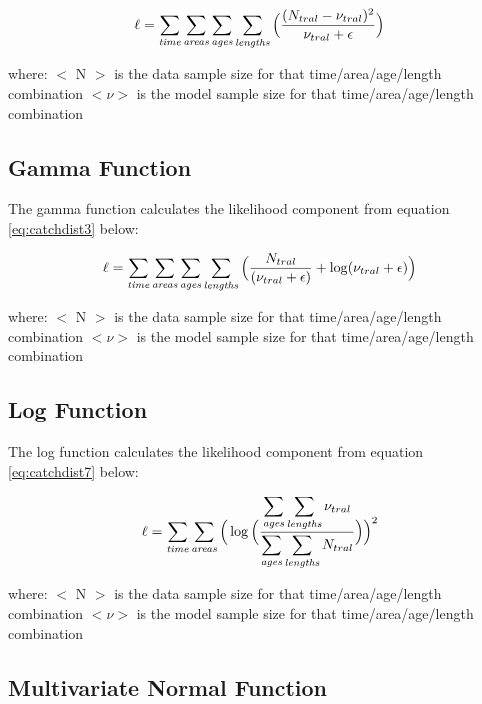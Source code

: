 \documentclass[]{book}
\begin{document}
\begin{equation}
\label{eq:catchdist2}
\ell = \sum_{\it time}\sum_{\it areas}\sum_{\it ages}\sum_{\it lengths} \Big( {\frac{ ( N_{tral} - \nu_{tral} ) ^2} {\nu_{tral} + \epsilon}} \Big)\end{equation}

where: \(<\) N \(>\) is the data sample size for that time/area/age/length
combination \(<\nu>\) is the model sample size for that
time/area/age/length combination

\hypertarget{gamma-function}{%
\subsection{Gamma Function}\label{gamma-function}}

The gamma function calculates the likelihood component from
equation \eqref{eq:catchdist3} below:

\begin{equation}
\label{eq:catchdist3}
\ell = \sum_{\it time}\sum_{\it areas}\sum_{\it ages}\sum_{\it lengths} \Big( {\frac{ N_{tral}} { (\nu_{tral} + \epsilon )} + \log ({\nu_{tral} + \epsilon}}) \Big)\end{equation}

where: \(<\) N \(>\) is the data sample size for that time/area/age/length
combination \(<\nu>\) is the model sample size for that
time/area/age/length combination

\hypertarget{log-function}{%
\subsection{Log Function}\label{log-function}}

The log function calculates the likelihood component from
equation \eqref{eq:catchdist7} below:

\begin{equation}
\label{eq:catchdist7}
\ell = \sum_{\it time}\sum_{\it areas} \Big( \log \Big( {\frac{ \displaystyle \sum_{\it ages}\sum_{\it lengths} \nu_{tral}} { \displaystyle \sum_{\it ages}\sum_{\it lengths} N_{tral}}} \Big) \Big) ^2\end{equation}

where: \(<\) N \(>\) is the data sample size for that time/area/age/length
combination \(<\nu>\) is the model sample size for that
time/area/age/length combination

\hypertarget{multivariate-normal-function}{%
\subsection{Multivariate Normal Function}\label{multivariate-normal-function}}
\end{document}
